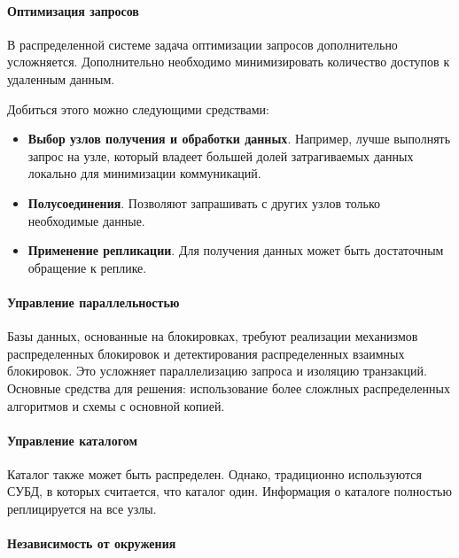 \paragraph{Оптимизация запросов}

В распределенной системе задача оптимизации запросов дополнительно усложняется. Дополнительно
необходимо минимизировать количество доступов к удаленным данным.

Добиться этого можно следующими средствами:

\begin{itemize}
	\item \textbf{Выбор узлов получения и обработки данных}. Например, лучше выполнять запрос на
	      узле, который владеет большей долей затрагиваемых данных локально для минимизации коммуникаций.
	\item \textbf{Полусоединения}. Позволяют запрашивать с других узлов только необходимые данные.
	\item \textbf{Применение репликации}. Для получения данных может быть достаточным обращение к
	      реплике.
\end{itemize}

\paragraph{Управление параллельностью}

Базы данных, основанные на блокировках, требуют реализации механизмов распределенных блокировок и
детектирования распределенных взаимных блокировок. Это усложняет параллелизацию запроса и изоляцию
транзакций. Основные средства для решения: использование более сложлных распределенных алгоритмов и
схемы с основной копией.

\paragraph{Управление каталогом}

Каталог также может быть распределен. Однако, традиционно используются СУБД, в которых считается,
что каталог один. Информация о каталоге полностью реплицируется на все узлы.

\paragraph{Независимость от окружения}

